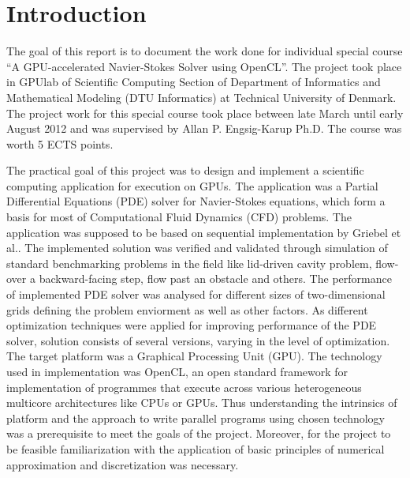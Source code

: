 \chapter{Introduction}
The goal of this report is to document the work done for individual special course \enquote{A GPU-accelerated Navier-Stokes Solver using OpenCL}. The project took place in GPUlab of Scientific Computing Section of Department of Informatics and Mathematical Modeling (DTU Informatics) at Technical University of Denmark. The project work for this special course took place between late March until early August 2012 and was supervised by Allan P. Engsig-Karup Ph.D. The course was worth 5 ECTS points.

The practical goal of this project was to design and implement a scientific computing application for execution on GPUs. The application was a Partial Differential Equations (PDE) solver for Navier-Stokes equations, which form a basis for most of Computational Fluid Dynamics (CFD) problems. The application was supposed to be based on sequential implementation by Griebel et al.\cite{griebel1998numerical}. The implemented solution was verified and validated through simulation of standard benchmarking problems in the field like lid-driven cavity problem, flow-over a backward-facing step, flow past an obstacle and others. The performance of implemented PDE solver was analysed for different sizes of two-dimensional grids defining the problem enviorment as well as other factors. As different optimization techniques were applied for improving performance of the PDE solver, solution consists of several versions, varying in the level of optimization. The target platform was a Graphical Processing Unit (GPU). The technology used in implementation was OpenCL, an open standard framework for implementation of programmes that execute across various heterogeneous multicore architectures like CPUs or GPUs. Thus understanding the intrinsics of platform and the approach to write parallel programs using chosen technology was a prerequisite to meet the goals of the project. Moreover, for the project to be feasible familiarization with the application of basic principles of numerical approximation and discretization was necessary.

